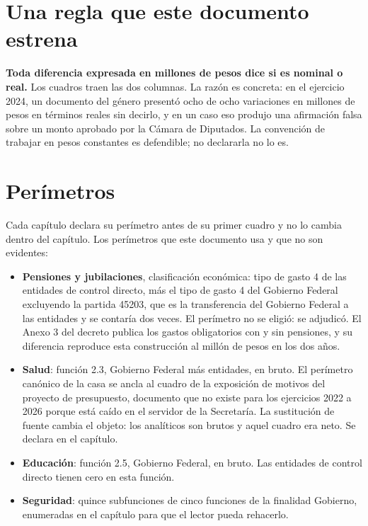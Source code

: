 \section*{Una regla que este documento estrena}

\textbf{Toda diferencia expresada en millones de pesos dice si es nominal o real.}
Los cuadros traen las dos columnas. La razón es concreta: en el ejercicio 2024, un
documento del género presentó ocho de ocho variaciones en millones de pesos en
términos reales sin decirlo, y en un caso eso produjo una afirmación falsa sobre
un monto aprobado por la Cámara de Diputados. La convención de trabajar en pesos
constantes es defendible; no declararla no lo es.

\section*{Perímetros}

Cada capítulo declara su perímetro antes de su primer cuadro y no lo cambia dentro
del capítulo. Los perímetros que este documento usa y que no son evidentes:

\begin{itemize}
\item \textbf{Pensiones y jubilaciones}, clasificación económica: tipo de gasto 4
de las entidades de control directo, más el tipo de gasto 4 del Gobierno Federal
excluyendo la partida 45203, que es la transferencia del Gobierno Federal a las
entidades y se contaría dos veces. El perímetro no se eligió: se adjudicó. El
Anexo 3 del decreto publica los gastos obligatorios con y sin pensiones, y su
diferencia reproduce esta construcción al millón de pesos en los dos años.
\item \textbf{Salud}: función 2.3, Gobierno Federal más entidades, en bruto. El
perímetro canónico de la casa se ancla al cuadro de la exposición de motivos del
proyecto de presupuesto, documento que no existe para los ejercicios 2022 a 2026
porque está caído en el servidor de la Secretaría. La sustitución de fuente cambia
el objeto: los analíticos son brutos y aquel cuadro era neto. Se declara en el
capítulo.
\item \textbf{Educación}: función 2.5, Gobierno Federal, en bruto. Las entidades
de control directo tienen cero en esta función.
\item \textbf{Seguridad}: quince subfunciones de cinco funciones de la finalidad
Gobierno, enumeradas en el capítulo para que el lector pueda rehacerlo.
\end{itemize}

